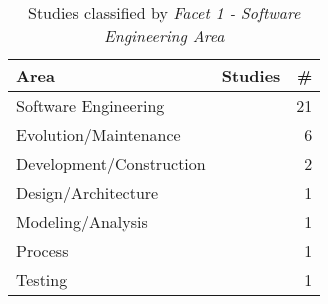 
\begin{table}[bt]
	\centering
	\caption{Studies classified by \it Facet 1 - Software Engineering Area}
		{\begin{tabular}{l|p{1.3in}|r }
			\bf Area & \bf Studies & \bf \# \\
			\hline
			Software Engineering & \citep{id0093, id1088, id4503, id4663, id4811, id4815, id5676, id17805, id17830, id17845, id18433, id5329, id5335, id0098, id0106, id1097, id1192, id1193, id4966, id5147, id18359} & 21 \\
			Evolution/Maintenance & \citep{id0135, id5343, id5353, id17796, id0115, id17800} & 6 \\
			Development/Construction &  \citep{id0089, id5546} & 2 \\
			Design/Architecture & \citep{id17882} & 1 \\
			Modeling/Analysis & \citep{id0134} & 1 \\
			Process & \citep{id5357} & 1 \\
			Testing & \citep{id5328}  & 1 \\		
		\end{tabular}} \label{tab:seAreaStudies}
\end{table}
